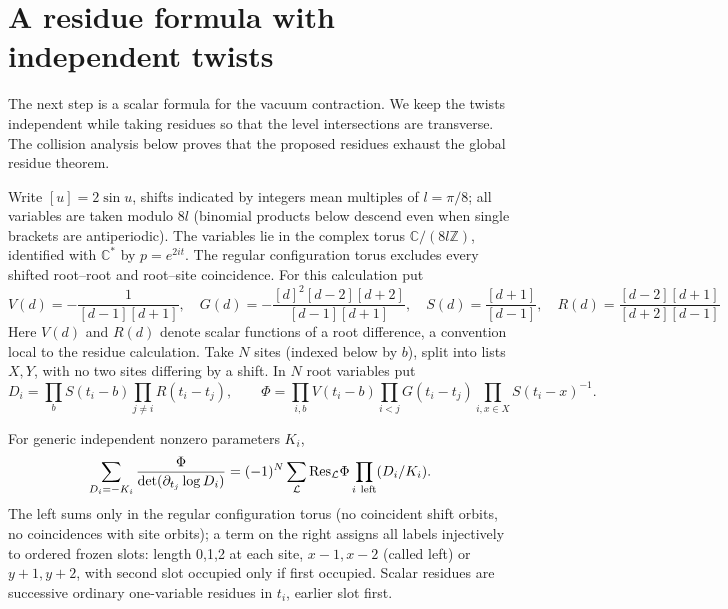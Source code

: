 \section{A residue formula with independent twists}\label{sec:residue}

The next step is a scalar formula for the vacuum contraction. We keep the twists independent while taking residues so that the level intersections are transverse. The collision analysis below proves that the proposed residues exhaust the global residue theorem.

Write \([u]=2\sin u\), shifts indicated by integers mean multiples of \(l=\pi/8\); all variables are taken modulo \(8l\) (binomial products below descend even when single brackets are antiperiodic). The variables lie in the complex torus $\mathbb C/(8l\mathbb Z)$, identified with $\mathbb C^*$ by $p=e^{2it}$. The regular configuration torus excludes every shifted root--root and root--site coincidence. For this calculation put
\[
 V(d)=-\frac1{[d-1][d+1]},\quad G(d)=-\frac{[d]^2[d-2][d+2]}{[d-1][d+1]},\quad
 S(d)=\frac{[d+1]}{[d-1]},\quad R(d)=\frac{[d-2][d+1]}{[d+2][d-1]}
\]
Here $V(d)$ and $R(d)$ denote scalar functions of a root difference, a convention local to the residue calculation. Take \(N\) sites (indexed below by \(b\)), split into lists \(X,Y\), with no two sites differing by a shift. In \(N\) root variables put
\[
 D_i=\prod_b S(t_i-b)\prod_{j\ne i}R(t_i-t_j),\qquad
 \Phi=\prod_{i,b}V(t_i-b)\prod_{i<j}G(t_i-t_j)\prod_{i,x\in X}S(t_i-x)^{-1}.
\]
\begin{lemma}\label{lem:residue}
For generic independent nonzero parameters \(K_i\),
\[
 \sum_{D_i=-K_i}\frac{\Phi}{\det(\partial_{t_j}\log D_i)}
 =(-1)^N\sum_{\mathcal L}
 \mathrm{Res}_{\mathcal L}\Phi\prod_{i\ {\rm left}}(D_i/K_i).
\]
The left sums only in the regular configuration torus (no coincident shift orbits, no coincidences with site orbits); a term on the right assigns all labels injectively to ordered frozen slots: length 0,1,2 at each site, \(x-1,x-2\) (called left) or \(y+1,y+2\), with second slot occupied only if first occupied. Scalar residues are successive ordinary one-variable residues in \(t_i\), earlier slot first.
\end{lemma} 

